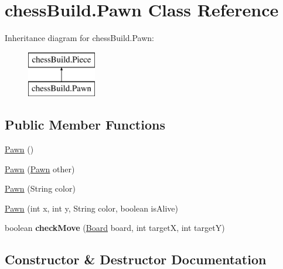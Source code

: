 \hypertarget{classchess_build_1_1_pawn}{}\section{chess\+Build.\+Pawn Class Reference}
\label{classchess_build_1_1_pawn}
Inheritance diagram for chess\+Build.\+Pawn\+:\begin{figure}[H]
\begin{center}
\leavevmode
\includegraphics[height=2.000000cm]{classchess_build_1_1_pawn}
\end{center}
\end{figure}
\subsection*{Public Member Functions}
\begin{DoxyCompactItemize}
\item 
\hyperlink{classchess_build_1_1_pawn_abe5ab01673eafb544f5cd3c84a73732d}{Pawn} ()
\item 
\hyperlink{classchess_build_1_1_pawn_aaf18709e792d82b09e27325a118d1230}{Pawn} (\hyperlink{classchess_build_1_1_pawn}{Pawn} other)
\item 
\hyperlink{classchess_build_1_1_pawn_a1e0b4fb3d9b21ef747f2ceb9a2438131}{Pawn} (String color)
\item 
\hyperlink{classchess_build_1_1_pawn_adb46f28a04fdd909fadcca6004df07ba}{Pawn} (int x, int y, String color, boolean is\+Alive)
\item 
\mbox{\label{classchess_build_1_1_pawn_a003a68c18a31adf0988dd09a8ffe7aa8}} 
boolean {\bfseries check\+Move} (\hyperlink{classchess_build_1_1_board}{Board} board, int targetX, int targetY)
\end{DoxyCompactItemize}


\subsection{Constructor \& Destructor Documentation}
\mbox{\label{classchess_build_1_1_pawn_abe5ab01673eafb544f5cd3c84a73732d}} 
